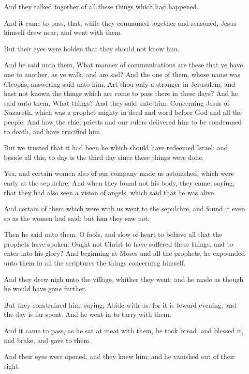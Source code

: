 \verse And they talked together of all these things which had happened.

\verse And it came to pass, that, while they communed together and reasoned, Jesus himself drew near, and went with them.

\verse But their eyes were holden that they should not know him.

\verse And he said unto them, What manner of communications are these that ye have one to another, as ye walk, and are sad?  \verse And the one of them, whose name was Cleopas, answering said unto him, Art thou only a stranger in Jerusalem, and hast not known the things which are come to pass there in these days?  \verse And he said unto them, What things? And they said unto him, Concerning Jesus of Nazareth, which was a prophet mighty in deed and word before God and all the people: \verse And how the chief priests and our rulers delivered him to be condemned to death, and have crucified him.

\verse But we trusted that it had been he which should have redeemed Israel: and beside all this, to day is the third day since these things were done.

\verse Yea, and certain women also of our company made us astonished, which were early at the sepulchre; \verse And when they found not his body, they came, saying, that they had also seen a vision of angels, which said that he was alive.

\verse And certain of them which were with us went to the sepulchre, and found it even so as the women had said: but him they saw not.

\verse Then he said unto them, O fools, and slow of heart to believe all that the prophets have spoken: \verse Ought not Christ to have suffered these things, and to enter into his glory?  \verse And beginning at Moses and all the prophets, he expounded unto them in all the scriptures the things concerning himself.

\verse And they drew nigh unto the village, whither they went: and he made as though he would have gone further.

\verse But they constrained him, saying, Abide with us: for it is toward evening, and the day is far spent. And he went in to tarry with them.

\verse And it came to pass, as he sat at meat with them, he took bread, and blessed it, and brake, and gave to them.

\verse And their eyes were opened, and they knew him; and he vanished out of their sight.

